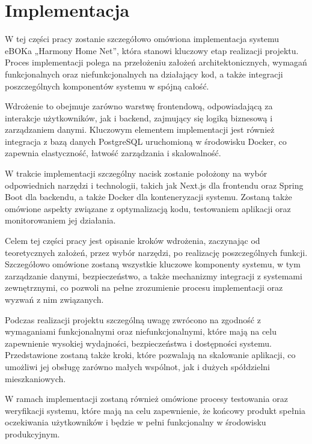 \chapter{Implementacja} 
W tej części pracy zostanie szczegółowo omówiona implementacja systemu eBOKa „Harmony Home Net”, która stanowi kluczowy etap realizacji projektu. Proces implementacji polega na przełożeniu założeń architektonicznych, wymagań funkcjonalnych oraz niefunkcjonalnych na działający kod, a także integracji poszczególnych komponentów systemu w spójną całość.

Wdrożenie to obejmuje zarówno warstwę frontendową, odpowiadającą za interakcje użytkowników, jak i backend, zajmujący się logiką biznesową i zarządzaniem danymi. Kluczowym elementem implementacji jest również integracja z bazą danych PostgreSQL uruchomioną w środowisku Docker, co zapewnia elastyczność, łatwość zarządzania i skalowalność.

W trakcie implementacji szczególny nacisk zostanie położony na wybór odpowiednich narzędzi i technologii, takich jak Next.js dla frontendu oraz Spring Boot dla backendu, a także Docker dla konteneryzacji systemu. Zostaną także omówione aspekty związane z optymalizacją kodu, testowaniem aplikacji oraz monitorowaniem jej działania.

Celem tej części pracy jest opisanie kroków wdrożenia, zaczynając od teoretycznych założeń, przez wybór narzędzi, po realizację poszczególnych funkcji. Szczegółowo omówione zostaną wszystkie kluczowe komponenty systemu, w tym zarządzanie danymi, bezpieczeństwo, a także mechanizmy integracji z systemami zewnętrznymi, co pozwoli na pełne zrozumienie procesu implementacji oraz wyzwań z nim związanych.

Podczas realizacji projektu szczególną uwagę zwrócono na zgodność z wymaganiami funkcjonalnymi oraz niefunkcjonalnymi, które mają na celu zapewnienie wysokiej wydajności, bezpieczeństwa i dostępności systemu. Przedstawione zostaną także kroki, które pozwalają na skalowanie aplikacji, co umożliwi jej obsługę zarówno małych wspólnot, jak i dużych spółdzielni mieszkaniowych.

W ramach implementacji zostaną również omówione procesy testowania oraz weryfikacji systemu, które mają na celu zapewnienie, że końcowy produkt spełnia oczekiwania użytkowników i będzie w pełni funkcjonalny w środowisku produkcyjnym.